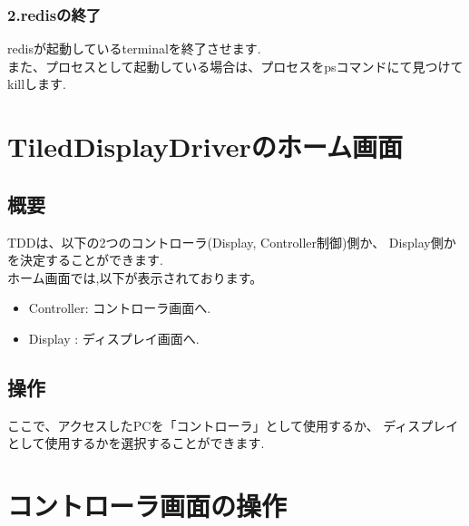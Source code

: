 \documentclass[a4paper,10pt,oneside]{jsbook}
\begin{document}
\subsection{2.redisの終了}
redisが起動しているterminalを終了させます.\\
また、プロセスとして起動している場合は、プロセスをpsコマンドにて見つけて
killします.\\

\chapter{TiledDisplayDriverのホーム画面}
\section{概要}
TDDは、以下の2つのコントローラ(Display, Controller制御)側か、
Display側かを決定することができます.\\
ホーム画面では,以下が表示されております。


\begin{itemize}
\item Controller: コントローラ画面へ.\\
\item Display   : ディスプレイ画面へ.\\
\end{itemize}

\section{操作}
ここで、アクセスしたPCを「コントローラ」として使用するか、
ディスプレイとして使用するかを選択することができます.\\




\chapter{コントローラ画面の操作}
\end{document}
